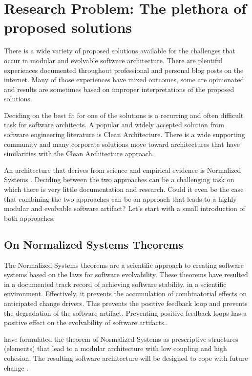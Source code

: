\section{Research Problem: The plethora of proposed solutions}
\label{sec:research_problem}

There is a wide variety of proposed solutions available for the challenges that occur in
modular and evolvable software architecture. There are plentiful experiences documented
throughout professional and personal blog posts on the internet. Many of those experiences
have mixed outcomes, some are opinionated and results are sometimes based on improper
interpretations of the proposed solutions.

Deciding on the best fit for one of the solutions is a recurring and often difficult task
for software architects. A popular and widely accepted solution from software engineering
literature is Clean Architecture. There is a wide supporting community and many corporate
solutions move toward architectures that have similarities with the Clean Architecture
approach. 

An architecture that derives from science and empirical evidence is Normalized Systems
\parencite*{mannaert_normalized_2009,mannaert_normalized_2016}. Deciding between the two
approaches can be a challenging task on which there is very little documentation and
research. Could it even be the case that combining the two approaches can be an approach
that leads to a highly modular and evolvable software artifact? Let's start with a small
introduction of both approaches.

\subsection{On Normalized Systems Theorems} \label{subsec:intro_to_ns}

The Normalized Systems theorems are a scientific approach to creating software systems
based on the laws for software evolvability. These theorems have resulted in a documented
track record of achieving software stability, in a scientific environment. Effectively, it
prevents the accumulation of combinatorial effects on anticipated change drivers. This
prevents the positive feedback loop and prevents the degradation of the software artifact.
Preventing positive feedback loops has a positive effect on the evolvability of software
artifacts.\parencite[]{mannaert_normalized_2009}. 

\citeauthor[]{mannaert_normalized_2009} have formulated the theorem of Normalized Systems
as prescriptive structures (elements) that lead to a modular architecture with low
coupling and high cohesion. The resulting software architecture will be designed to cope
with future change \parencites[]{mannaert_normalized_2009}.

